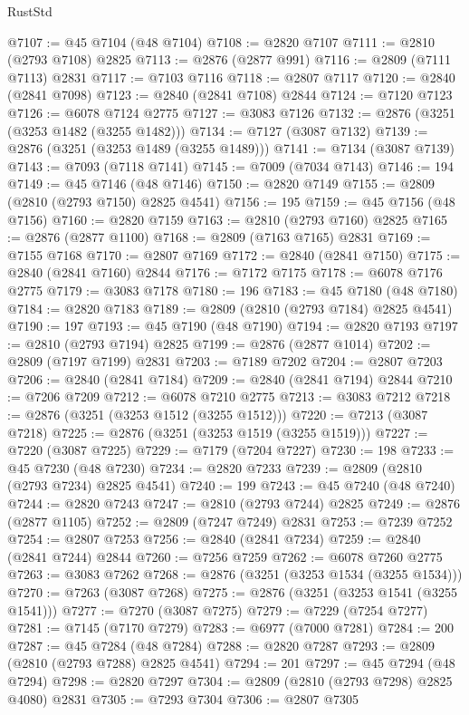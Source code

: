 \begin{lexlean}{RustStd}
\begin{coremodule}
@7107 := @45 @7104 (@48 @7104)
@7108 := @2820 @7107
@7111 := @2810 (@2793 @7108) @2825
@7113 := @2876 (@2877 @991)
@7116 := @2809 (@7111 @7113) @2831
@7117 := @7103 @7116
@7118 := @2807 @7117
@7120 := @2840 (@2841 @7098)
@7123 := @2840 (@2841 @7108) @2844
@7124 := @7120 @7123
@7126 := @6078 @7124 @2775
@7127 := @3083 @7126
@7132 := @2876 (@3251 (@3253 @1482 (@3255 @1482)))
@7134 := @7127 (@3087 @7132)
@7139 := @2876 (@3251 (@3253 @1489 (@3255 @1489)))
@7141 := @7134 (@3087 @7139)
@7143 := @7093 (@7118 @7141)
@7145 := @7009 (@7034 @7143)
@7146 := 194
@7149 := @45 @7146 (@48 @7146)
@7150 := @2820 @7149
@7155 := @2809 (@2810 (@2793 @7150) @2825 @4541)
@7156 := 195
@7159 := @45 @7156 (@48 @7156)
@7160 := @2820 @7159
@7163 := @2810 (@2793 @7160) @2825
@7165 := @2876 (@2877 @1100)
@7168 := @2809 (@7163 @7165) @2831
@7169 := @7155 @7168
@7170 := @2807 @7169
@7172 := @2840 (@2841 @7150)
@7175 := @2840 (@2841 @7160) @2844
@7176 := @7172 @7175
@7178 := @6078 @7176 @2775
@7179 := @3083 @7178
@7180 := 196
@7183 := @45 @7180 (@48 @7180)
@7184 := @2820 @7183
@7189 := @2809 (@2810 (@2793 @7184) @2825 @4541)
@7190 := 197
@7193 := @45 @7190 (@48 @7190)
@7194 := @2820 @7193
@7197 := @2810 (@2793 @7194) @2825
@7199 := @2876 (@2877 @1014)
@7202 := @2809 (@7197 @7199) @2831
@7203 := @7189 @7202
@7204 := @2807 @7203
@7206 := @2840 (@2841 @7184)
@7209 := @2840 (@2841 @7194) @2844
@7210 := @7206 @7209
@7212 := @6078 @7210 @2775
@7213 := @3083 @7212
@7218 := @2876 (@3251 (@3253 @1512 (@3255 @1512)))
@7220 := @7213 (@3087 @7218)
@7225 := @2876 (@3251 (@3253 @1519 (@3255 @1519)))
@7227 := @7220 (@3087 @7225)
@7229 := @7179 (@7204 @7227)
@7230 := 198
@7233 := @45 @7230 (@48 @7230)
@7234 := @2820 @7233
@7239 := @2809 (@2810 (@2793 @7234) @2825 @4541)
@7240 := 199
@7243 := @45 @7240 (@48 @7240)
@7244 := @2820 @7243
@7247 := @2810 (@2793 @7244) @2825
@7249 := @2876 (@2877 @1105)
@7252 := @2809 (@7247 @7249) @2831
@7253 := @7239 @7252
@7254 := @2807 @7253
@7256 := @2840 (@2841 @7234)
@7259 := @2840 (@2841 @7244) @2844
@7260 := @7256 @7259
@7262 := @6078 @7260 @2775
@7263 := @3083 @7262
@7268 := @2876 (@3251 (@3253 @1534 (@3255 @1534)))
@7270 := @7263 (@3087 @7268)
@7275 := @2876 (@3251 (@3253 @1541 (@3255 @1541)))
@7277 := @7270 (@3087 @7275)
@7279 := @7229 (@7254 @7277)
@7281 := @7145 (@7170 @7279)
@7283 := @6977 (@7000 @7281)
@7284 := 200
@7287 := @45 @7284 (@48 @7284)
@7288 := @2820 @7287
@7293 := @2809 (@2810 (@2793 @7288) @2825 @4541)
@7294 := 201
@7297 := @45 @7294 (@48 @7294)
@7298 := @2820 @7297
@7304 := @2809 (@2810 (@2793 @7298) @2825 @4080) @2831
@7305 := @7293 @7304
@7306 := @2807 @7305

\end{coremodule}
\end{lexlean}
